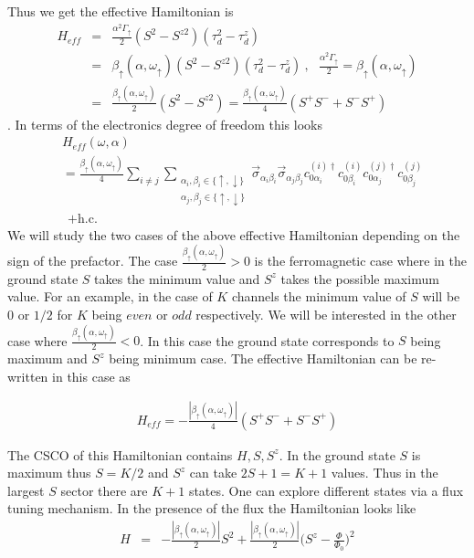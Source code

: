 \documentclass[reprint,prb,superscriptaddress]{revtex4-2}
\begin{document}
Thus we get the effective Hamiltonian is 
\begin{eqnarray}
H_{eff} &=& \frac{\alpha^2 \Gamma_{\uparrow}}{2} (S^2-S^{z2})(\tau^2_{d}-\tau^z_d)  \nonumber\\
&=& \beta_{\uparrow}(\alpha,\omega_{\uparrow})(S^2-S^{z2})(\tau^2_{d}-\tau^z_d)~,~~~\frac{\alpha^2 \Gamma_{\uparrow}}{2} =\beta_{\uparrow}(\alpha,\omega_{\uparrow}) \nonumber\\
&=& \frac{\beta_{\uparrow}(\alpha,\omega_{\uparrow})}{2} (S^2-S^{z2})   =\frac{\beta_{\uparrow}(\alpha,\omega_{\uparrow})}{4} (S^+S^-+S^-S^+)   
\end{eqnarray}
. In terms of the electronics degree of freedom this looks 
\begin{align}
&H_{eff}(\omega,\alpha) \nonumber\\
&= \frac{ \beta_{\uparrow}(\alpha,\omega_{\uparrow}) }{4}    \displaystyle\sum_{i\neq j}\displaystyle\sum_{\substack{ \alpha_i,\beta_i\in \{\uparrow,\downarrow\}\\ \alpha_j,\beta_j\in \{\uparrow,\downarrow\}}}\vec{\sigma}_{\alpha_i\beta_i}\vec{\sigma}_{\alpha_j\beta_j}  c_{0\alpha_i}^{(i)\dagger}  c_{0\beta_i}^{(i)}    c_{0\alpha_j}^{(j)\dagger}  c_{0\beta_j}^{(j)}\nonumber\\
& ~~ +\textrm{h.c.}   
\label{eq:all-to-all_1}
\end{align}
We will study the two cases of the above effective Hamiltonian depending on the sign of the prefactor. The case $\frac{\beta_{\uparrow}(\alpha,\omega_{\uparrow})}{2} >0$ is the ferromagnetic case where in the ground state $S$ takes the minimum value and $S^z$ takes the possible maximum value. For an example, in the case of $K$ channels the minimum value of $S$ will be $0$ or $1/2$ for $K$ being $even $ or $odd$ respectively.  We will be interested in the other case where $\frac{\beta_{\uparrow}(\alpha,\omega_{\uparrow})}{2} <0$. In this case the ground state corresponds to $S$ being maximum and $S^z$ being minimum case. The effective Hamiltonian can be re-written in this case as

\begin{eqnarray}
H_{eff}   =-\frac{|\beta_{\uparrow}(\alpha,\omega_{\uparrow})|}{4} (S^+S^{-}+ S^-S^{+})    
\end{eqnarray}

\noindent The CSCO of this Hamiltonian contains $H,S,S^z$. In the ground state $S$ is maximum thus $S=K/2$ and $S^z$ can take $2S+1=K+1$ values. Thus in the largest $S$ sector there are $K+1$ states. One can explore different states via a flux tuning mechanism. In the presence of the flux the Hamiltonian looks like
\begin{eqnarray}
H &=& -\frac{|\beta_{\uparrow}(\alpha,\omega_{\uparrow})|}{2} S^2   +\frac{|\beta_{\uparrow}(\alpha,\omega_{\uparrow})|}{2} \bigg(S^{z}-\frac{\Phi}{\Phi_0} \bigg)^2 
\label{eq:flux_spectral}
\end{eqnarray}
\end{document}
